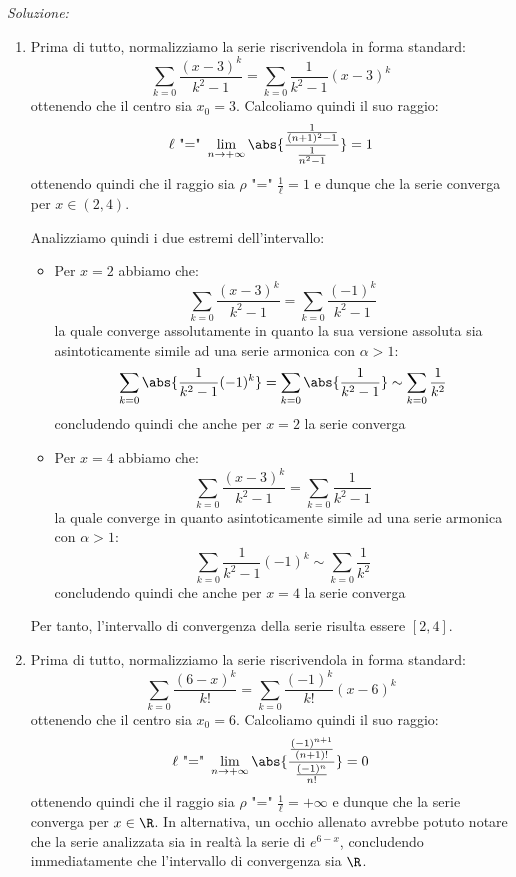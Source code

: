 \documentclass[a4paper, 12pt]{report}
\begin{document}
    \textit{Soluzione:}
    \begin{enumerate}
        \item Prima di tutto, normalizziamo la serie riscrivendola in forma standard:
        \[\sum\limits_{k = 0} \frac{(x-3)^k}{k^2-1} = \sum\limits_{k = 0} \frac{1}{k^2-1}(x-3)^k\]
        ottenendo che il centro sia $x_0= 3$. Calcoliamo quindi il suo raggio:
        \[\ell \text{ "=" }\lim_{n \to +\infty} \abs{\frac{\frac{1}{(n+1)^2-1}}{\frac{1}{n^2-1}}} = 1\]
        ottenendo quindi che il raggio sia $\rho \text{ "=" } \frac{1}{\ell} = 1$ e dunque che la serie converga per $x \in (2, 4)$.

        Analizziamo quindi i due estremi dell'intervallo:
        \begin{itemize}
            \item Per $x = 2$ abbiamo che:
            \[\sum\limits_{k = 0} \frac{(x-3)^k}{k^2-1} = \sum\limits_{k = 0} \frac{(-1)^k}{k^2-1}\]
            la quale converge assolutamente in quanto la sua versione assoluta sia asintoticamente simile ad una serie armonica con $\alpha > 1$:
            \[\sum\limits_{k = 0} \abs{\frac{1}{k^2-1}(-1)^k} = \sum\limits_{k = 0} \abs{\frac{1}{k^2-1}} \sim \sum\limits_{k = 0} \frac{1}{k^2}\]
            concludendo quindi che anche per $x = 2$ la serie converga
            
            \item Per $x = 4$ abbiamo che:
            \[\sum\limits_{k = 0} \frac{(x-3)^k}{k^2-1} = \sum\limits_{k = 0} \frac{1}{k^2-1}\]
            la quale converge in quanto asintoticamente simile ad una serie armonica con $\alpha > 1$:
            \[\sum\limits_{k = 0} \frac{1}{k^2-1}(-1)^k \sim \sum\limits_{k = 0} \frac{1}{k^2}\]
            concludendo quindi che anche per $x = 4$ la serie converga
        \end{itemize}

        Per tanto, l'intervallo di convergenza della serie risulta essere $[2, 4]$. 

        \item Prima di tutto, normalizziamo la serie riscrivendola in forma standard:
        \[\sum\limits_{k = 0} \dfrac{(6-x)^k}{k!} = \sum\limits_{k = 0} \frac{(-1)^k}{k!}(x-6)^k\]
        ottenendo che il centro sia $x_0= 6$. Calcoliamo quindi il suo raggio:
        \[\ell \text{ "=" }\lim_{n \to +\infty} \abs{\frac{\frac{(-1)^{n+1}}{(n+1)!}}{\frac{(-1)^n}{n!}}} = 0\]
        ottenendo quindi che il raggio sia $\rho \text{ "=" } \frac{1}{\ell} = +\infty$ e dunque che la serie converga per $x \in \R$. In alternativa, un occhio allenato avrebbe potuto notare che la serie analizzata sia in realtà la serie di $e^{6-x}$, concludendo immediatamente che l'intervallo di convergenza sia $\R$.


\end{enumerate}
\end{document}
